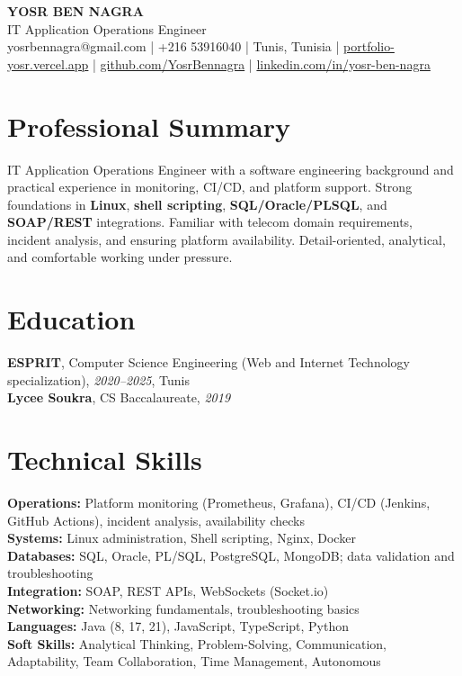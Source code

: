 \documentclass[10pt,a4paper]{article}
\begin{document}
\begin{center}
  {\Large\bfseries YOSR BEN NAGRA}\\[2pt]
  {\small IT Application Operations Engineer}\\[3pt]
  {\footnotesize yosrbennagra@gmail.com \;|\; +216 53916040 \;|\; Tunis, Tunisia \;|\; \href{https://portfolio-yosr.vercel.app/en}{portfolio-yosr.vercel.app} \;|\; \href{https://github.com/YosrBennagra}{github.com/YosrBennagra} \;|\; \href{https://www.linkedin.com/in/yosr-ben-nagra/}{linkedin.com/in/yosr-ben-nagra}}
\end{center}

\section*{Professional Summary}
{\small
IT Application Operations Engineer with a software engineering background and practical experience in monitoring, CI/CD, and platform support. Strong foundations in \textbf{Linux}, \textbf{shell scripting}, \textbf{SQL/Oracle/PLSQL}, and \textbf{SOAP/REST} integrations. Familiar with telecom domain requirements, incident analysis, and ensuring platform availability. Detail-oriented, analytical, and comfortable working under pressure.
}

\vspace{4pt}

\section*{Education}
{\small
\textbf{ESPRIT}, Computer Science Engineering (Web and Internet Technology specialization), \textit{2020--2025}, Tunis\\[1pt]
\textbf{Lycee Soukra}, CS Baccalaureate, \textit{2019}
}

\vspace{4pt}

\section*{Technical Skills}
{\small
\textbf{Operations:} Platform monitoring (Prometheus, Grafana), CI/CD (Jenkins, GitHub Actions), incident analysis, availability checks\\[2pt]
\textbf{Systems:} Linux administration, Shell scripting, Nginx, Docker\\[2pt]
\textbf{Databases:} SQL, Oracle, PL/SQL, PostgreSQL, MongoDB; data validation and troubleshooting\\[2pt]
\textbf{Integration:} SOAP, REST APIs, WebSockets (Socket.io)\\[2pt]
\textbf{Networking:} Networking fundamentals, troubleshooting basics\\[2pt]
\textbf{Languages:} Java (8, 17, 21), JavaScript, TypeScript, Python\\[2pt]
\textbf{Soft Skills:} Analytical Thinking, Problem-Solving, Communication, Adaptability, Team Collaboration, Time Management, Autonomous
}
\end{document}
